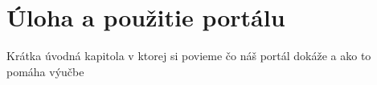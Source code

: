 \chapter{Úloha a použitie portálu}
\label{kap:overview}
Krátka úvodná kapitola v ktorej si povieme čo náš portál dokáže a ako to pomáha výučbe